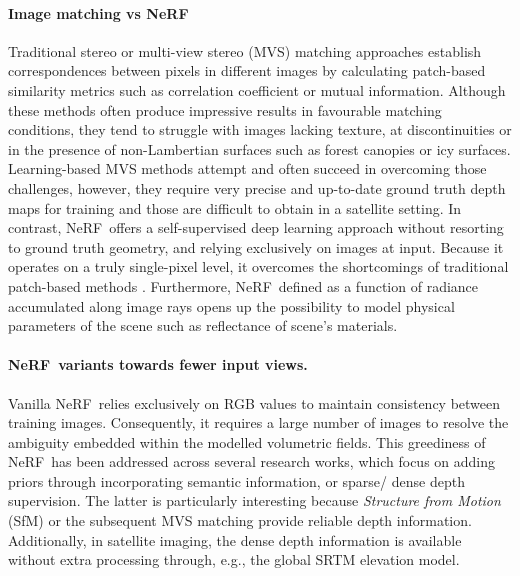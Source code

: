 \documentclass{isprs} %
\newcommand{\Nerf}{{NeRF}}
\begin{document}
\paragraph{Image matching vs \Nerf}
Traditional stereo or multi-view stereo (MVS) matching approaches \cite{hirschmuller2005accurate,gallup2007real,bleyer2011patchmatch,bulatov2011multi,furukawa2009accurate} establish correspondences between pixels in different images by calculating patch-based similarity metrics such as correlation coefficient or mutual information. Although these methods often produce impressive results in favourable matching conditions, they tend to struggle with images lacking texture, at discontinuities or in the presence of non-Lambertian surfaces such as forest canopies or icy surfaces.
Learning-based MVS methods \cite{bittner2019late,stucker2020resdepth,gao2021rational,gomez2022experimental,huang2018deepmvs}  
 attempt and often succeed in overcoming those challenges, however, they require very precise and up-to-date ground truth depth maps for training and those are difficult to obtain in a satellite setting.  In contrast, \Nerf~offers a self-supervised deep learning approach without resorting to ground truth geometry, and relying exclusively on images at input. Because it operates on a truly single-pixel level, it overcomes the shortcomings of traditional patch-based methods \cite{buades2015reliable}. Furthermore, \Nerf~defined as a function of radiance accumulated along image rays opens up the possibility to model physical parameters of the scene such as reflectance of scene's materials. 
 


\paragraph{\Nerf~variants towards fewer input views.}
Vanilla \Nerf~relies exclusively on RGB values to maintain consistency between training images. Consequently, it requires a large number of images to resolve the ambiguity embedded within the modelled volumetric fields. This greediness of \Nerf~has been addressed across several research works, which focus on adding priors through incorporating semantic information, or sparse/ dense depth supervision. The latter is particularly interesting because \textit{Structure from Motion} (SfM) or the subsequent MVS matching provide reliable depth information. Additionally, in satellite imaging, the dense depth information is available without extra processing through, e.g., the global SRTM elevation model.
\end{document}
